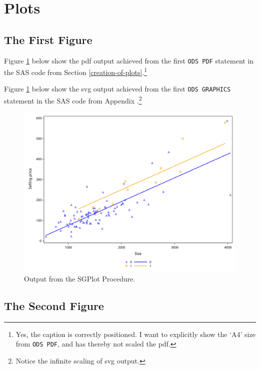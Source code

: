 \documentclass[a4paper,oneside]{memoir}
\let\rmarkdownfootnote\footnote%
\def\footnote{\protect\rmarkdownfootnote}
\begin{document}
\hypertarget{plots}{%
\section{Plots}\label{plots}}

\hypertarget{the-first-figure}{%
\subsection{The First Figure}\label{the-first-figure}}

Figure \ref{fig:Graph-1} below show the pdf output achieved from the first \texttt{ODS\ PDF} statement in the SAS code from Section \ref{creation-of-plots}.\footnote{Yes, the caption is correctly positioned. I want to explicitly show the `A4' size from \texttt{ODS\ PDF}, and has thereby not scaled the pdf.}

Figure \ref{fig:Graph-1} below show the svg output achieved from the first \texttt{ODS\ GRAPHICS} statement in the SAS code from Appendix .\footnote{Notice the infinite scaling of svg output.}

\newpage

\begin{figure}[htbp!]

{\centering \includegraphics[width=1\linewidth]{graphs/EX13_G1} 

}

\caption{Output from the SGPlot Procedure.}\label{fig:Graph-1}
\end{figure}

\newpage

\hypertarget{the-second-figure}{%
\subsection{The Second Figure}\label{the-second-figure}}
\end{document}
